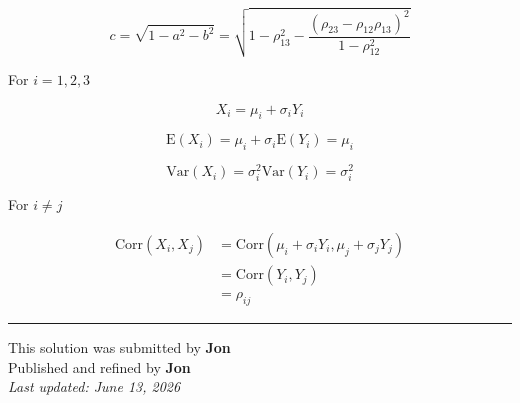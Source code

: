 ﻿\documentclass[12pt]{article}
\begin{document}
$$
c=\sqrt{1-a^2-b^2}=\sqrt{
1-\rho_{13}^2
-\frac{(\rho_{23}-\rho_{12}\rho_{13})^2}
{1-\rho_{12}^2}
}$$


For $i=1,2,3$

$$
\boxed{X_i=\mu_i+\sigma_iY_i}
$$

$$\mathrm{E}(X_i)=\mu_i+\sigma_i\mathrm{E}(Y_i)=\mu_i$$

$$\mathrm{Var}(X_i)=\sigma_i^2\mathrm{Var}(Y_i)=\sigma_i^2$$

For $i\neq j$

\begin{align*}
\mathrm{Corr}(X_i,X_j)
&=\mathrm{Corr}(\mu_i+\sigma_iY_i,\mu_j+\sigma_jY_j)\\
&=\mathrm{Corr}(Y_i,Y_j)\\
&=\rho_{ij}
\end{align*}

\bigskip
\hrule
\begin{center}
    This solution was submitted by \textbf{Jon}\\[4pt]
    Published and refined by \textbf{Jon}\\[8pt]
    \textit{Last updated: June 13, 2026}
\end{center}
\end{document}
